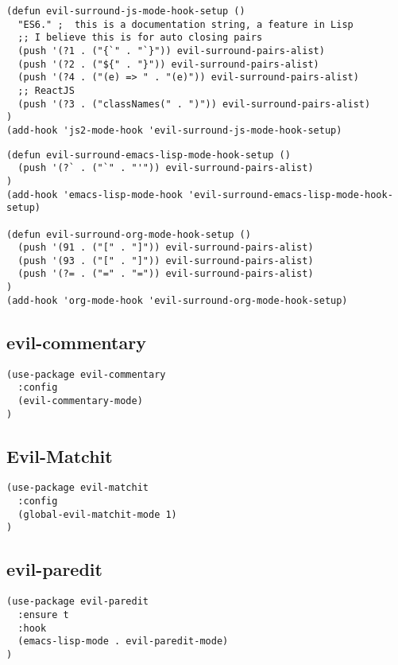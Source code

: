 \documentclass[11pt]{article}
\begin{document}
\begin{verbatim}
(defun evil-surround-js-mode-hook-setup ()
  "ES6." ;  this is a documentation string, a feature in Lisp
  ;; I believe this is for auto closing pairs
  (push '(?1 . ("{`" . "`}")) evil-surround-pairs-alist)
  (push '(?2 . ("${" . "}")) evil-surround-pairs-alist)
  (push '(?4 . ("(e) => " . "(e)")) evil-surround-pairs-alist)
  ;; ReactJS
  (push '(?3 . ("classNames(" . ")")) evil-surround-pairs-alist)
)
(add-hook 'js2-mode-hook 'evil-surround-js-mode-hook-setup)
\end{verbatim}

\begin{verbatim}
(defun evil-surround-emacs-lisp-mode-hook-setup ()
  (push '(?` . ("`" . "'")) evil-surround-pairs-alist)
)
(add-hook 'emacs-lisp-mode-hook 'evil-surround-emacs-lisp-mode-hook-setup)

(defun evil-surround-org-mode-hook-setup ()
  (push '(91 . ("[" . "]")) evil-surround-pairs-alist)
  (push '(93 . ("[" . "]")) evil-surround-pairs-alist)
  (push '(?= . ("=" . "=")) evil-surround-pairs-alist)
)
(add-hook 'org-mode-hook 'evil-surround-org-mode-hook-setup)
\end{verbatim}

\subsection*{evil-commentary}
\label{sec:orgebbf974}

\begin{verbatim}
(use-package evil-commentary
  :config
  (evil-commentary-mode)
)
\end{verbatim}

\subsection*{Evil-Matchit}
\label{sec:orgd6bf0a4}
\begin{verbatim}
(use-package evil-matchit
  :config
  (global-evil-matchit-mode 1)
)
\end{verbatim}

\subsection*{evil-paredit}
\label{sec:org02a6e16}

\begin{verbatim}
(use-package evil-paredit
  :ensure t
  :hook
  (emacs-lisp-mode . evil-paredit-mode)
)
\end{verbatim}
\end{document}
